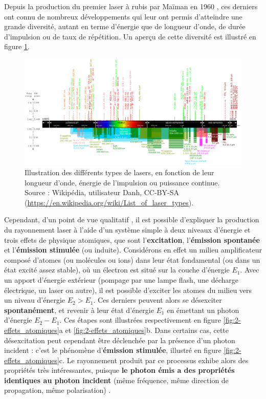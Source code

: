 \begin{refsection}
Depuis la production du premier laser à rubis par Maïman en 1960 \parencite{hennequin_2013}, ces derniers ont connu de nombreux développements qui leur ont permis d'atteindre une grande diversité, autant en terme d'énergie que de longueur d'onde, de durée d'impulsion ou de taux de répétition. Un aperçu de cette diversité est illustré en figure \ref{fig:2-diversite_laser}.

\begin{figure}[htbp]
    \centering
    \includegraphics[width=\linewidth]{2-laser/Commercial_laser_lines.png}
    \caption{Illustration des différents types de lasers, en fonction de leur longueur d'onde, énergie de l'impulsion ou puissance continue. Source : Wikipédia, utilisateur Danh, CC-BY-SA (\href{https://en.wikipedia.org/wiki/List_of_laser_types}{https://en.wikipedia.org/wiki/List\_of\_laser\_types}).}
    \label{fig:2-diversite_laser}
\end{figure}

Cependant, d'un point de vue qualitatif \parencite{hennequin_2013}, il est possible d'expliquer la production du rayonnement laser à l'aide d'un système simple à deux niveaux d'énergie et trois effets de physique atomiques, que sont l'\textbf{excitation}, l'\textbf{émission spontanée} et l'\textbf{émission stimulée} (ou induite). Considérons en effet un milieu amplificateur composé d'atomes (ou molécules ou ions) dans leur état fondamental (ou dans un état excité assez stable), où un électron est situé sur la couche d'énergie $E_1$. Avec un apport d'énergie extérieur (pompage par une lampe flash, une décharge électrique, un laser ou autre), il est possible d'exciter les atomes du milieu vers un niveau d'énergie $E_2>E_1$. Ces derniers peuvent alors se désexciter \textbf{spontanément}, et revenir à leur état d'énergie $E_1$ en émettant un photon d'énergie $E_2-E_1$. Ces étapes sont illustrées respectivement en figure \ref{fig:2-effets_atomiques}a et \ref{fig:2-effets_atomiques}b. Dans certains cas, cette désexcitation peut cependant être déclenchée par la présence d'un photon incident : c'est le phénomène d'\textbf{émission stimulée}, illustré en figure \ref{fig:2-effets_atomiques}c. Le rayonnement produit par ce processus exhibe alors des propriétés très intéressantes, puisque \textbf{le photon émis a des propriétés identiques au photon incident} (même fréquence, même direction de propagation, même polarisation) \parencite{hennequin_2013}.


\end{refsection}
